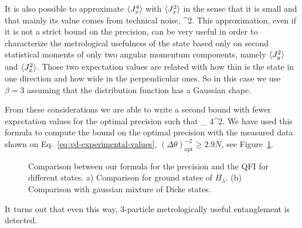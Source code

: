 It is also possible to approximate $\langle J_x^4 \rangle$ with $\langle J_x^2 \rangle$ in the sense that it is small and that mainly its value comes from technical noise,
\be
   \approx \beta {}^2.
\ee
This approximation, even if it is not a strict bound on the precision, can be very useful in order to characterize the metrological usefulness of the state based only on second statistical moments of only two angular momentum components, namely $\expect{J_y^2}$ and $\langle J_x^2 \rangle$.
Those two expectation values are related with how  thin is the state in one direction and how wide in the perpendicular ones.
So in this case we use $\beta=3$ assuming that the distribution function has a Gaussian shape.

From these considerations we are able to write a second bound with fewer expectation values for the optimal precision such that
\be
  \varian{\theta}_{} \leq {}
  {4^2}.
\ee
We have used this formula to compute the bound on the optimal precision with the measured data shown on Eq.~\eqref{eq:vd-experimental-values}, $(\Delta \theta)^{-2}_{\text{opt}} \geq 2.9N$, see Figure~\ref{fig:vd-experimental}.
\begin{figure}[htp]
  \centering
  \caption[(a) Region of precision and experimental data. (b) Constant $\expect{J_y^2}$ section.]{Comparison between our formula for the precision and the QFI for different states. a) Comparison for ground states of $H_\lambda$. (b) Comparison with gaussian mixture of Dicke states.}
  \label{fig:vd-experimental}
\end{figure}
It turns out that even this way, 3-particle metrologically useful entanglement is detected.
